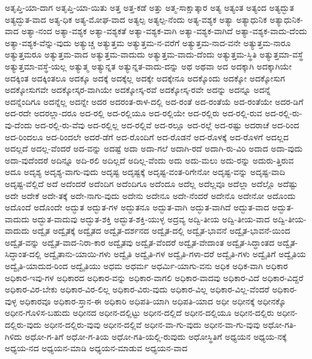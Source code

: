 {ಅತೃಪ್ತಿ-ಯಾ-ದಾಗ
ಅತೃಪ್ತಿ-ಯಾ-ಯಿತು
ಅತ್ತ
ಅತ್ತ-ಕಡೆ
ಅತ್ತು
ಅತ್ಮ-ಸಾಕ್ಷಾತ್ಕಾರ
ಅತ್ಯ
ಅತ್ಯಂತ
ಅತ್ಯಂದ
ಅತ್ಯದ್ಭುತ
ಅತ್ಯದ್ಭುತ-ವಾದ
ಅತ್ಯ-ಧಿಕ
ಅತ್ಯ-ಮೋಘ-ವಾದ
ಅತ್ಯಲ್ಪ
ಅತ್ಯಲ್ಪ-ನೆಂದು
ಅತ್ಯ-ವಶ್ಯಕ
ಅತ್ಯಾ
ಅತ್ಯಾಧುನಿಕ
ಅತ್ಯಾಧುನಿಕ-ವಾದ
ಅತ್ಯಾ-ನಂದ
ಅತ್ಯಾ-ವಶ್ಯಕ
ಅತ್ಯಾ-ವಶ್ಯಕತೆ
ಅತ್ಯಾ-ವಶ್ಯಕ-ವಾಗಿ
ಅತ್ಯಾ-ವಶ್ಯಕ-ವಾಗಿದೆ
ಅತ್ಯಾ-ವಶ್ಯಕ-ವಾದು-ದೆಂದು
ಅತ್ಯಾ-ವಶ್ಯಕ-ವೆನ್ನು-ವುದು
ಅತ್ಯುಚ್ಚ
ಅತ್ಯುತ್ತಮ
ಅತ್ಯುತ್ತಮ-ನ-ವರೆಗೆ
ಅತ್ಯುತ್ತಮ-ನಾದ-ವನೇ
ಅತ್ಯುತ್ತಮ-ನಾರೂ
ಅತ್ಯುತ್ತಮರೂ
ಅತ್ಯುತ್ತಮ-ವಾದ
ಅತ್ಯುತ್ತಮ-ವಾದುದು
ಅತ್ಯುತ್ತಮ-ವಾದು-ದೆಂದು
ಅತ್ಯುತ್ತಮ-ಸ್ಥಿತಿ
ಅತ್ಯುತ್ತಮಾ-ವಸ್ಥೆ
ಅತ್ಯುತ್ತಮಾ-ವಸ್ಥೆ-ಯಲ್ಲ
ಅತ್ಯುತ್ಮ
ಅತ್ಯುನ್ನತ
ಅತ್ಯುನ್ನತ-ವಾದು-ದನ್ನು
ಅಥ
ಅಥವಾ
ಅದ
ಅದಕ್ಕಾಗಿ
ಅದಕ್ಕಾಗಿಯೇ
ಅದಕ್ಕಿಂತ
ಅದಕ್ಕಿಂತಲೂ
ಅದಕ್ಕೂ
ಅದಕ್ಕೆ
ಅದಕ್ಕೆಲ್ಲ
ಅದಕ್ಕೇ
ಅದಕ್ಕೇನೂ
ಅದಕ್ಕೊಂದು
ಅದಕ್ಕೋ
ಅದಕ್ಕೋಸುಗ
ಅದಕ್ಕೋಸುಗವೇ
ಅದಕ್ಕೋಸ್ಕರ-ವಾಗಿಯೇ
ಅದಕ್ಕೋಸ್ಕ-ರವೆ
ಅದಕ್ಕೋಸ್ಕ-ರವೇ
ಅದನ್ನು
ಅದನ್ನೂ
ಅದನ್ನೆ
ಅದನ್ನೆಂದಿಗೂ
ಅದನ್ನೆಲ್ಲ
ಅದನ್ನೇ
ಅದರ
ಅದರಂತ-ರಾಳ-ದಲ್ಲಿ
ಅದ-ರಂತೆ
ಅದ-ರಂತೆಯೆ
ಅದ-ರಂತೆಯೇ
ಅದರ-ಡಿಗೆ
ಅದ-ರದೇ
ಅದರಲ್ಲಾ-ದರೂ
ಅದ-ರಲ್ಲಿ
ಅದ-ರಲ್ಲಿಯೂ
ಅದ-ರಲ್ಲಿಯೇ
ಅದ-ರಲ್ಲಿರು
ಅದ-ರಲ್ಲಿ-ರುವ
ಅದ-ರಲ್ಲಿ-ರು-ವು-ದೆಂದು
ಅದ-ರಲ್ಲಿ-ರು-ವೆವು
ಅದ-ರಲ್ಲಿಲ್ಲ
ಅದ-ರಲ್ಲಿವೆ
ಅದ-ರಲ್ಲೂ
ಅದ-ರಲ್ಲೆ
ಅದ-ರಷ್ಟು
ಅದರಾಚೆ
ಅದ-ರಿಂದ
ಅದ-ರಿಂದಲೂ
ಅದ-ರಿಂದಲೇ
ಅದರೆ-ಡೆಗೆ
ಅದ-ರೊಂದಿಗೆ
ಅದ-ರೊಡನೆ
ಅದ-ರೊಳಕ್ಕೆ
ಅದ-ರೊಳಗೆ
ಅದಲ್ಲದ
ಅದಲ್ಲದೆ
ಅದಲ್ಲ-ವೆಂದರೆ
ಅದ-ವನ್ನು
ಅದಷ್ಟೆ
ಅದಾ
ಅದಾ-ಗಲೆ
ಅದಾಗಿ-ರದೆ
ಅದಾಗಿ-ರು-ವಿರಿ
ಅದಾದ
ಅದಾ-ವುದು
ಅದಾ-ವುದೆಂದರೆ
ಅದಿನ್ನೂ
ಅದಿ-ರಲಿ
ಅದಿಲ್ಲದೆ
ಅದಿಲ್ಲ-ವೆಂದು
ಅದು
ಅದು-ಮಲು
ಅದು-ರನ್ನು
ಅದುರು-ತ್ತಿರುವ
ಅದೂ
ಅದೃಶ್ಯ
ಅದೃಶ್ಯ-ವಾಗು-ವುದು
ಅದೃಷ್ಟ
ಅದೃಷ್ಟಕ್ಕೆ
ಅದೃಷ್ಟ-ವಂತ-ರಿಗೇನೋ
ಅದೃಷ್ಟ-ವನ್ನು
ಅದೃಷ್ಟ-ವಾದಿ
ಅದೃಷ್ಟ-ವೆಲ್ಲಿದೆ
ಅದೆ
ಅದೆಂದರೆ
ಅದೆಂದಿಗ
ಅದೆಂದಿಗೂ
ಅದೆಂದೂ
ಅದೆಲ್ಲ
ಅದೆಲ್ಲವೂ
ಅದೆಲ್ಲಾ
ಅದೆಲ್ಲೊ
ಅದೆಷ್ಟು
ಅದೇ
ಅದೇಕೆ
ಅದೇ-ತಕ್ಕೆ
ಅದೇ-ನಾಗು-ವುದು
ಅದೇನು
ಅದೇನೂ
ಅದೇ-ನೆಂದರೆ
ಅದೇನೊ
ಅದೇನೋ
ಅದೊಂದು
ಅದೊಂದೆ
ಅದೊಂದೇ
ಅದ್ಭುತ
ಅದ್ಭುತ-ಗಳ
ಅದ್ಭುತನೂ
ಅದ್ಭುತ-ವಾಗಿ
ಅದ್ಭುತ-ವಾಗಿದೆ
ಅದ್ಭುತ-ವಾದ
ಅದ್ಭುತ-ವಾದುದು
ಅದ್ಭುತ-ವಾದುವು
ಅದ್ಭುತ-ಶಕ್ತಿ
ಅದ್ಭುತ-ಶಕ್ತಿ-ಯುಳ್ಳ
ಅದ್ರವ್ಯ
ಅದ್ವಿ-ತೀಯ
ಅದ್ವಿ-ತೀಯ-ವಾದ
ಅದ್ವಿ-ತೀಯ-ವಾದುದು
ಅದ್ವೈತ
ಅದ್ವೈತಕ್ಕೆ
ಅದ್ವೈತದ
ಅದ್ವೈತ-ದರ್ಶನದ
ಅದ್ವೈತ-ದಲ್ಲಿ
ಅದ್ವೈತ-ಭಾವನೆ
ಅದ್ವೈತ-ಭಾವನೆ-ಯಿಂದ
ಅದ್ವೈತ-ವನ್ನು
ಅದ್ವೈತ-ವಾದ-ನಿರಾ-ಕಾರ
ಅದ್ವೈತವು
ಅದ್ವೈತ-ವೆಂದರೆ
ಅದ್ವೈತ-ವೇದಾಂತ
ಅದ್ವೈತ-ಸಿದ್ಧಾಂತದ
ಅದ್ವೈತ-ಸಿದ್ಧಾಂತ-ದಲ್ಲಿ
ಅದ್ವೈತಾನು-ಯಾಯಿ-ಗಳು
ಅದ್ವೈತಿ
ಅದ್ವೈತಿ-ಗಳ
ಅದ್ವೈತಿ-ಗಳಾ-ದರೆ
ಅದ್ವೈತಿ-ಗಳು
ಅದ್ವೈತಿಗೆ
ಅದ್ವೈತಿಯ
ಅದ್ವೈತಿ-ಯಾದುದ-ರಿಂದ
ಅದ್ವೈತಿಯು
ಅಧಮ
ಅಧರ್ಮ
ಅಧರ್ಮಿ-ಯಾಗು-ವನು
ಅಧಿಕ
ಅಧಿಕ-ವಾಗಿ
ಅಧಿಕಾರ
ಅಧಿಕಾರ-ಇವು-ಗಳ
ಅಧಿಕಾರದ
ಅಧಿಕಾರ-ವನ್ನು
ಅಧಿಕಾರ-ವಾಗಲಿ
ಅಧಿಕಾರ-ವಾದವು
ಅಧಿಕಾರ-ವಿದೆ
ಅಧಿಕಾರ-ವಿದ್ದರೆ
ಅಧಿಕಾರ-ವಿರ-ಬೇಕು
ಅಧಿಕಾರ-ವಿರ-ಲಿಲ್ಲ
ಅಧಿಕಾರ-ವಿರು-ವುದು
ಅಧಿಕಾರ-ವಿಲ್ಲ
ಅಧಿಕಾರ-ವಿಲ್ಲ-ವೆಂದರೆ
ಅಧಿಕಾರ-ವುಳ್ಳ
ಅಧಿಕಾರವೂ
ಅಧಿಕಾರ-ಸ್ತಾನ-ಈ
ಅಧಿಕಾರಿ
ಅಧಿಪತಿ-ಯಾಗಿ
ಅಧಿಪತಿ-ಯಾದ
ಅಧೀ
ಅಧೀನಕ್ಕೆ
ಅಧೀನಕ್ಕೊ
ಅಧೀನ-ಗೊಳಿಸ-ಬಹುದು
ಅಧೀನದ
ಅಧೀನ-ದಲ್ಲಿಟ್ಟು
ಅಧೀನ-ದಲ್ಲಿದೆ
ಅಧೀನ-ದಲ್ಲಿಯೂ
ಅಧೀನ-ದಲ್ಲಿರು
ಅಧೀನ-ದಲ್ಲಿರು-ವುದು
ಅಧೀನ-ದಲ್ಲಿರು-ವುವು
ಅಧೀನ-ದಲ್ಲಿವೆ
ಅಧೀನ-ವಾ-ಗು-ವುದು
ಅಧೀನ-ವಾ-ಗು-ವುವು
ಅಧೋ-ಗತಿ-ಗಿಳಿದು
ಅಧೋ-ಗ-ತಿಗೆ
ಅಧೋ-ಗ-ತಿಯ
ಅಧೋ-ಗತಿ-ಯಲ್ಲಿ-ರುವುದು
ಅಧೋಸ್ಥಿತಿಗೆ
ಅಧ್ಯಯನ
ಅಧ್ಯಯ-ನಕ್ಕೆ
ಅಧ್ಯಯ-ನದ
ಅಧ್ಯಯನ-ಮಾಡಿ
ಅಧ್ಯಯನ-ಮಾಡುವ
ಅಧ್ಯಯನ-ವಾದ
}
